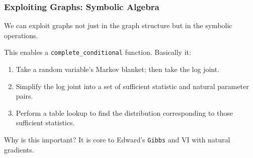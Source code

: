 \documentclass[10pt,
               xcolor={usenames,dvipsnames},
               hyperref={colorlinks,linktoc=all,citecolor=Plum,linkcolor=MidnightBlue,urlcolor=MidnightBlue},noamssymb]{beamer}
\begin{document}
\begin{frame}
\frametitle{Exploiting Graphs: Symbolic Algebra}
We can exploit graphs not just in the graph structure but in the
symbolic operations.

This enables a \texttt{complete\_conditional} function. Basically it:
\begin{enumerate}
\item
Take a random variable's Markov blanket; then take the log joint.
\item
Simplify the log joint into a set of sufficient statistic and natural
parameter pairs.
\item
Perform a table lookup to find the distribution corresponding to those
sufficient statistics.
\end{enumerate}

Why is this important?
It is core to Edward's \texttt{Gibbs} and VI with natural gradients.
\end{frame}




\end{document}
